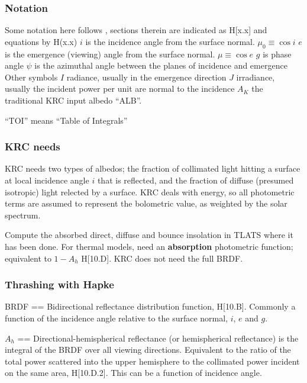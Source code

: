 
\subsubsection{Notation} %
Some notation here follows , sections therein are indicated as
H[x.x] and equations by H(x.x) 
\qi $i$ is the incidence angle from the surface normal. $\mu_0 \equiv \cos i$
\qi $e$ is the emergence (viewing) angle from the surface normal. $\mu \equiv \cos e$
\qi $g$ is phase angle
\qi $\psi$ is the azimuthal angle between the planes of incidence and emergence 
\\ Other symbols
\qi $I$ radiance, usually in the emergence direction
\qi $J$ irradiance, usually the incident power per unit are normal to the incidence
\qi $A_K$ the traditional KRC input albedo ``ALB''.

 ``TOI'' means ``Table of Integrals'' 

\subsubsection{KRC needs} %

KRC needs two types of albedos; the fraction of collimated light hitting a
surface at local incidence angle $i$ that is reflected, and the fraction of
diffuse (presumed isotropic) light relected by a surface. KRC deals with energy,
so all photometric terms are assumed to represent the bolometric value, as
weighted by the solar spectrum.

Compute the absorbed direct, diffuse and bounce insolation in TLATS where it has
been done.  For thermal models, need an \textbf{absorption} photometric
function; equivalent to $1-A_h$ H[10.D].  KRC does not need the full BRDF.


\subsubsection{Thrashing with Hapke} %

BRDF == Bidirectional reflectance distribution function, H[10.B]. Commonly a
function of the incidence angle relative to the surface normal, $i$, $e$ and
$g$.

$A_h$ == Directional-hemispherical reflectance (or hemispherical reflectance) is
the integral of the BRDF over all viewing directions. Equivalent to the ratio of
the total power scattered into the upper hemisphere to the collimated power
incident on the same area, H[10.D.2]. This can be a function of incidence
angle.

